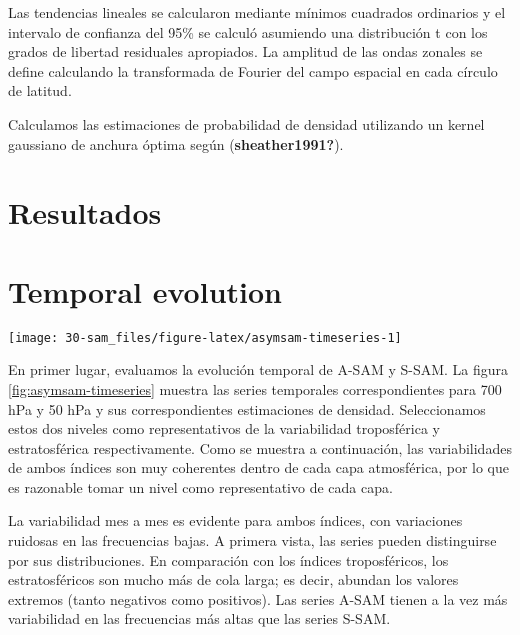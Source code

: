 \documentclass[12pt,oneside]{reedthesis}
\begin{document}
Las tendencias lineales se calcularon mediante mínimos cuadrados ordinarios y el intervalo de confianza del 95\% se calculó asumiendo una distribución t con los grados de libertad residuales apropiados.
La amplitud de las ondas zonales se define calculando la transformada de Fourier del campo espacial en cada círculo de latitud.

Calculamos las estimaciones de probabilidad de densidad utilizando un kernel gaussiano de anchura óptima según (\textbf{sheather1991?}).

\hypertarget{resultados}{%
\section{Resultados}\label{resultados}}

\hypertarget{temporal}{%
\section{Temporal evolution}\label{temporal}}
\begin{figure*}
\texttt{[image: 30-sam\_files/figure-latex/asymsam-timeseries-1]} \caption{Time series for A-SAM and S-SAM at (a) 50~hPa and (b) 700~hPa. To the right, probability density estimate of each index. Series are standardised by the standard deviation of the SAM at each level.}\label{fig:asymsam-timeseries}
\end{figure*}
En primer lugar, evaluamos la evolución temporal de A\nobreakdash-SAM y S\nobreakdash-SAM.
La figura \ref{fig:asymsam-timeseries} muestra las series temporales correspondientes para 700 hPa y 50 hPa y sus correspondientes estimaciones de densidad.
Seleccionamos estos dos niveles como representativos de la variabilidad troposférica y estratosférica respectivamente.
Como se muestra a continuación, las variabilidades de ambos índices son muy coherentes dentro de cada capa atmosférica, por lo que es razonable tomar un nivel como representativo de cada capa.

La variabilidad mes a mes es evidente para ambos índices, con variaciones ruidosas en las frecuencias bajas.
A primera vista, las series pueden distinguirse por sus distribuciones.
En comparación con los índices troposféricos, los estratosféricos son mucho más de cola larga; es decir, abundan los valores extremos (tanto negativos como positivos).
Las series A\nobreakdash-SAM tienen a la vez más variabilidad en las frecuencias más altas que las series S\nobreakdash-SAM.
\end{document}

